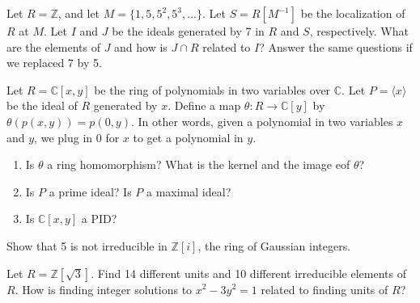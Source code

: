 \documentclass[12pt,letterpaper,boxed]{hmcpset}
\begin{document}

\begin{problem}[17.1.14]
Let $R = \mathbb{Z}$, and let $M = \{1,5,5^2,5^3,...\}$. Let $S = R[M^{-1}]$ be the localization of $R$ at $M$. Let $I$ and $J$ be the ideals generated by 7 in $R$ and $S$, respectively. What are the elements of $J$ and how is $J \cap R$ related to $I$? Answer the same questions if we replaced 7 by 5.
\end{problem}

\begin{solution}
\end{solution}

\clearpage

\begin{problem}[18.1.16]
Let $R = \mathbb{C}[x,y]$ be the ring of polynomials in two variables over $\mathbb{C}$. Let $P = \langle x \rangle$ be the ideal of $R$ generated by $x$. Define a map $\theta: R \rightarrow \mathbb{C}[y]$ by $\theta(p(x,y)) = p(0,y)$. In other words, given a polynomial in two variables $x$ and $y$, we plug in 0 for $x$ to get a polynomial in $y$.
\begin{enumerate}[label=\alph*]
\item Is $\theta$ a ring homomorphism? What is the kernel and the image eof  $\theta$?
\item Is $P$ a prime ideal? Is $P$ a maximal ideal?
\item Is $\mathbb{C}[x,y]$ a PID?
\end{enumerate}
\end{problem}

\begin{solution}
\end{solution}

\clearpage

\begin{problem}[18.1.18]
Show that 5 is not irreducible in $\mathbb{Z}[i]$, the ring of Gaussian integers.
\end{problem}

\begin{solution}
\end{solution}

\clearpage

\begin{problem}[18.1.20]
Let $R = \mathbb{Z}[\sqrt{3}]$. Find 14 different units and 10 different irreducible elements of $R$. How is finding integer solutions to $x^2 - 3y^2 = 1$ related to finding units of $R$?
\end{problem}
\end{document}
